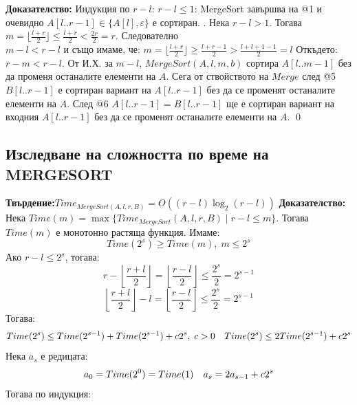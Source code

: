\documentclass{article}
\renewcommand{\\}{\newline}
\newcommand{\tv}{\textbf{Твърдение:\;}}
\newcommand{\doc}{\textbf{Доказателство: }}
\begin{document}
\doc Индукция по \(r - l\): \\\\
\underline{\(r - l \leq 1\)}: MergeSort завършва на @1 и очевидно \(A[l..r-1] \in \{A[l], \varepsilon\} \) е сортиран. \\\\
. Нека \(r-l> 1\). Тогава \(m = \lfloor \frac{l+r}{2} \rfloor \leq \frac{l+r}{2} < \frac{2r}{2} = r\).\\\\
Следователно \(m - l < r - l \text{ и също имаме, че: } m = \lfloor \frac{l+r}{2} \rfloor \geq \frac{l+r-1}{2} > \frac{l + l + 1 - 1}{2} = l\) \\\\
Откъдето: \(r - m < r - l\). \\\\
От И.Х. за \(m - l\), \(MergeSort(A, l, m, b)\) сортира \(A[l..m-1]\) без да променя останалите елементи на \(A\). \\\\
Сега от ствойството на \(Merge\) след @5 \(B[l..r-1]\) е сортиран вариант на \(A[l..r-1]\)  без да се променят останалите елементи на \(A\). \\\\
След @6 \(A[l..r-1] = B[l..r-1]\) ще е сортиран вариант на входния \(A[l..r-1]\) без да се променят останалите елементи на \(A\). \qed \\\\



\subsection{Изследване на сложността по време на MERGESORT}

\tv \(Time_{MergeSort(A, l, r ,B)} = O((r-l)\log_2 (r-l))\) \\\\
\doc Нека \(Time(m) = \max \{Time_{MergeSort}(A, l, r, B) \;|\; r - l \leq m\}\). \\\\
Тогава \(Time(m)\) е монотонно растяща функция. Имаме:
\[Time(2^s) \geq Time(m),\; m \leq 2^s \]
Ако \(r - l \leq 2^s\), тогава:
\[r - \left\lfloor \frac{r+l}{2} \right\rfloor  = \left\lfloor \frac{r - l}{2}\right\rfloor \leq \frac{2^{s}}{2} = 2^{s-1}\]
\[\left\lfloor \frac{r+l}{2} \right\rfloor - l = \left\lfloor \frac{r - l}{2}\right\rfloor \leq \frac{2^{s}}{2} = 2^{s-1}\]
Тогава: \[\begin{aligned}
    & Time(2^s) \leq Time(2^{s-1}) + Time(2^{s-1}) + c2^s, \; c>0 \\
    & Time(2^s) \leq 2Time(2^{s-1}) + c2^s
\end{aligned}\]
Нека \(a_s\) е редицата: \[\begin{aligned}
    & a_0 = Time(2^0) = Time(1) \\ & a_s = 2a_{s-1} + c2^s
\end{aligned}\]
Тогава по индукция: 
\end{document}
